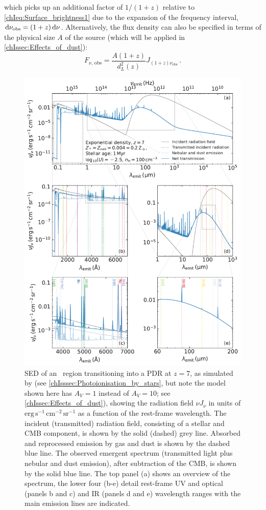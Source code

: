 \noindent which picks up an additional factor of $1/(1+z)$ relative to \cref{chIeq:Surface_brightness1} due to the expansion of the frequency interval, $\dif \nu_\text{obs} = (1+z) \dif \nu$. Alternatively, the flux density can also be specified in terms of the physical size $A$ of the source (which will be applied in \cref{chIssec:Effects_of_dust}):
\begin{equation}
    \label{chIeq:Flux_density2}
    F_{\nu, \, \text{obs}} = \frac{A \left( 1 + z \right)}{d_L^2(z)} J_{(1 + z) \nu_\text{obs}} \, .
\end{equation}
\begin{figure}
    \centering
    \includegraphics[width=0.9\linewidth]{"Figs/Cloudy_spectra"}
    \caption[SED of an \HII\ region transitioning into a PDR.]{SED of an \HII\ region transitioning into a PDR at $z = 7$, as simulated by  (see \cref{chIsssec:Photoionisation_by_stars}, but note the model shown here has $A_V = 1$ instead of $A_V = 10$; see \cref{chIssec:Effects_of_dust}), showing the radiation field $\nu J_\nu$ in units of $\mathrm{erg \, s^{-1} \, cm^{-2} \, sr^{-1}}$ as a function of the rest-frame wavelength. The incident (transmitted) radiation field, consisting of a stellar and CMB component, is shown by the solid (dashed) grey line. Absorbed and reprocessed emission by gas and dust is shown by the dashed blue line. The observed emergent spectrum (transmitted light plus nebular and dust emission), after subtraction of the CMB, is shown by the solid blue line. The top panel (a) shows an overview of the spectrum, the lower four (b-e) detail rest-frame UV and optical (panels b and c) and IR (panels d and e) wavelength ranges with the main emission lines are indicated.}
    \label{chIfig:Cloudy_spectra}
\end{figure}

